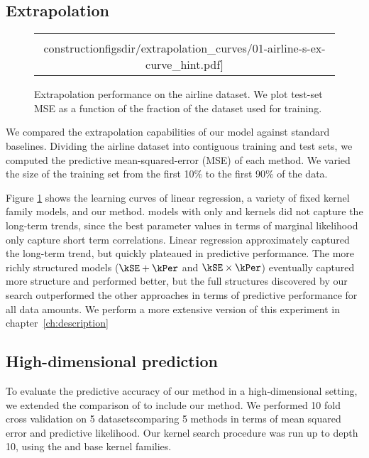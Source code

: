 \subsection{Extrapolation}

\begin{figure}
\centering
\begin{tabular}{c}
\hspace{-0.0cm} \texttt{[image: \\constructionfigsdir/extrapolation\_curves/01-airline-s-ex-curve\_hint.pdf]}
\end{tabular}
\caption{Extrapolation performance on the airline dataset.  We plot test-set MSE as a function of the fraction of the dataset used for training. 
}
\label{fig:extrapolation}
\end{figure}

We compared the extrapolation capabilities of our model against standard baselines\footnotemark.
Dividing the airline dataset into contiguous training and test sets, we computed the predictive mean-squared-error (MSE) of each method.
We varied the size of the training set from the first 10\% to the first 90\% of the data.

Figure \ref{fig:extrapolation} shows the learning curves of linear regression, a variety of fixed kernel family \gp{} models, and our method.  
\gp{} models with only \kSE{} and \kPer{} kernels did not capture the long-term trends, since the best parameter values in terms of \gp{} marginal likelihood only capture short term correlations. 
Linear regression approximately captured the long-term trend, but quickly plateaued in predictive performance.
The more richly structured \gp{} models (${\kSE + \kPer}$ and ${\kSE \times \kPer}$) eventually captured more structure and performed better, but the full structures discovered by our search outperformed the other approaches in terms of predictive performance for all data amounts.
We perform a more extensive version of this experiment in chapter~\ref{ch:description}


\subsection{High-dimensional prediction}

To evaluate the predictive accuracy of our method in a high-dimensional setting, we extended the comparison of \cite{Duvenaud2011-wb} to include our method.
We performed 10 fold cross validation on 5 datasets\footnotemark comparing 5 methods in terms of mean squared error and predictive likelihood.
Our kernel search procedure was run up to depth 10, using the \SE{} and \RQ{} base kernel families.

